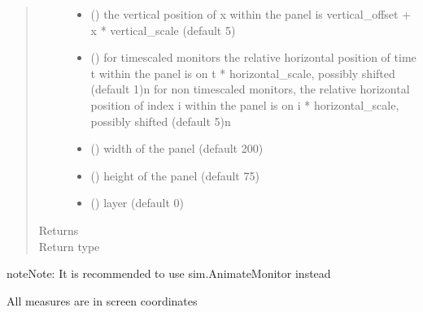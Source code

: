 \documentclass[letterpaper,10pt,english]{sphinxmanual}
\begin{document}
\begin{fulllineitems}
\begin{fulllineitems}
\begin{quote}
\begin{description}
\begin{itemize}
\begin{description}
\end{description}


\item {} 
 () \textendash{} the vertical position of x within the panel is
vertical\_offset + x * vertical\_scale (default 5)

\item {} 
 () \textendash{} for timescaled monitors the relative horizontal position of time t within the panel is on
t * horizontal\_scale, possibly shifted (default 1)\textbar{}n\textbar{}
for non timescaled monitors, the relative horizontal position of index i within the panel is on
i * horizontal\_scale, possibly shifted (default 5)\textbar{}n\textbar{}

\item {} 
 () \textendash{} width of the panel (default 200)

\item {} 
 () \textendash{} height of the panel (default 75)

\item {} 
 () \textendash{} layer (default 0)

\end{itemize}

\item[{Returns}] \leavevmode
{}

\item[{Return type}] \leavevmode
{\hyperref[\detokenize{Reference:salabim.AnimateMonitor}]{}}

\end{description}\end{quote}

\begin{sphinxadmonition}{note}{Note:}
It is recommended to use sim.AnimateMonitor instead 

All measures are in screen coordinates 
\end{sphinxadmonition}

\end{fulllineitems}



\end{fulllineitems}
\end{document}
